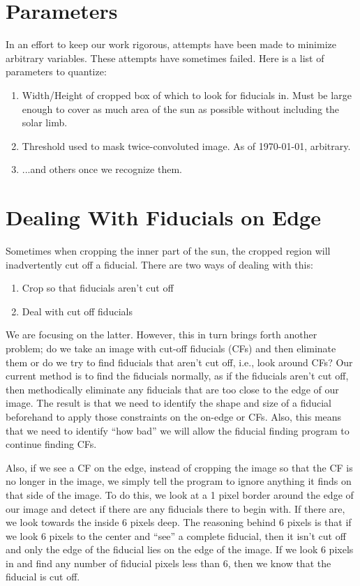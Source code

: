 \documentclass[10pt]{article}
\begin{document}
\section{Parameters}
    In an effort to keep our work rigorous, attempts have been made to minimize arbitrary variables. These attempts have sometimes failed. Here is a list of parameters to quantize:
    \begin{enumerate}
        \item Width/Height of cropped box of which to look for fiducials in. Must be large enough to cover as much area of the sun as possible without including the solar limb.
        \item Threshold used to mask twice-convoluted image. As of \today, arbitrary.
        \item ...and others once we recognize them.
    \end{enumerate}

\section{Dealing With Fiducials on Edge} %
\label{sec:dealing_witb_fiducials_on_edge}
    Sometimes when cropping the inner part of the sun, the cropped region will inadvertently cut off a fiducial. There are two ways of dealing with this:

    \begin{enumerate}
         \item Crop so that fiducials aren't cut off
         \item Deal with cut off fiducials
     \end{enumerate} 

     We are focusing on the latter. However, this in turn brings forth another problem; do we take an image with cut-off fiducials (CFs) and then eliminate them or do we try to find fiducials that aren't cut off, i.e., look around CFs? Our current method is to find the fiducials normally, as if the fiducials aren't cut off, then methodically eliminate any fiducials that are too close to the edge of our image. The result is that we need to identify the shape and size of a fiducial beforehand to apply those constraints on the on-edge or CFs. Also, this means that we need to identify ``how bad'' we will allow the fiducial finding program to continue finding CFs.

     Also, if we see a CF on the edge, instead of cropping the image so that the CF is no longer in the image, we simply tell the program to ignore anything it finds on that side of the image. To do this, we look at a 1 pixel border around the edge of our image and detect if there are any fiducials there to begin with. If there are, we look towards the inside 6 pixels deep. The reasoning behind 6 pixels is that if we look 6 pixels to the center and ``see'' a complete fiducial, then it isn't cut off and only the edge of the fiducial lies on the edge of the image. If we look 6 pixels in and find any number of fiducial pixels less than 6, then we know that the fiducial is cut off. 
\end{document}
